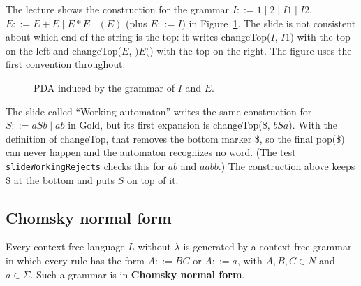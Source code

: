 The lecture shows the construction for the grammar
$I ::= 1 \mid 2 \mid I1 \mid I2$, $E ::= E + E \mid E * E \mid (E)$ (plus $E ::= I$)
in Figure~\ref{fig:ie-pda}. The slide is not consistent about which end of the
string is the top: it writes changeTop($I$, $I1$) with the top on the left and
changeTop($E$, $)E($) with the top on the right. The figure uses the first
convention throughout.

\begin{figure}[h]
\centering
{}
\caption{PDA induced by the grammar of $I$ and $E$.}
\label{fig:ie-pda}
\end{figure}

The slide called ``Working automaton'' writes the same construction for
$S ::= aSb \mid ab$ in Gold, but its first expansion is changeTop(\$, $bSa$). With
the definition of changeTop, that removes the bottom marker \$, so the final
pop(\$) can never happen and the automaton recognizes no word. (The test
\texttt{slideWorkingRejects} checks this for $ab$ and $aabb$.) The construction
above keeps \$ at the bottom and puts $S$ on top of it.

\subsection{Chomsky normal form}

\begin{theorem}
Every context-free language $L$ without $\lambda$ is generated by a context-free
grammar in which every rule has the form $A ::= BC$ or $A ::= a$, with $A, B,
C \in N$ and $a \in \Sigma$. Such a grammar is in \textbf{Chomsky normal form}.
\end{theorem}

